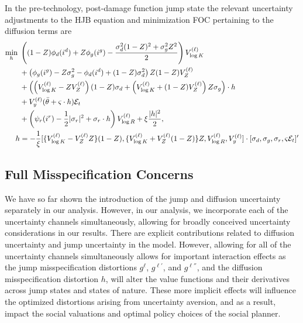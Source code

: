 \documentclass[12pt]{article}
\begin{document}
\begin{appendices}
In the pre-technology, post-damage function jump state the relevant uncertainty adjustments to the HJB equation and minimization FOC pertaining to the diffusion terms are
\begin{equation*}
\begin{split}
\min_{h} \hspace{0.1cm} & \left((1-Z) \phi_d(i^{d})+Z \phi_g(i^{g}) -\frac{   \sigma_d^2 (1-Z)^2 + \sigma_g^2 Z^2 }{2} \right)V^{(\ell)}_{\log K} \\
 & +\left( \phi_g(i^{g}) - Z \sigma_g^2 - \phi_d(i^{d}) + (1-Z) \sigma_d^2  \right) Z (1-Z) V^{(\ell)}_{Z}\\
 & + \left( \left( V^{(\ell)}_{\log K} -  Z V^{(\ell)}_{Z} \right) (1-Z) \sigma_d  + \left( V^{(\ell)}_{\log K} + (1-Z) V^{(\ell)}_{Z} \right)  Z \sigma_g \right) \cdot h \\
 & + V^{(\ell)}_{y} (\bar{\theta} + \varsigma \cdot h) \mathcal{E}_t \\
 & +\left(\psi_{r}(i^{r}) -\frac{1}{2}|\sigma_{r}|^{2} + \sigma_{r} \cdot h \right) V^{(\ell)}_{\log R} + \xi \frac{|h|^2}{2}, \\
h & = -\frac{1}{\xi}[\{V^{(\ell)}_{\log K}-V^{(\ell)}_{Z}Z\}(1-Z),\{V^{(\ell)}_{\log K}+V^{(\ell)}_{Z}(1-Z)\}Z,V^{(\ell)}_{\log R},V^{(\ell)}_{y}]  \cdot[\sigma_{d},\sigma_{g},\sigma_{r},\varsigma \mathcal{E}_t]'    
\end{split}
\end{equation*}

\subsection{Full Misspecification Concerns}

We have so far shown the introduction of the jump and diffusion uncertainty separately in our analysis. However, in our analysis, we incorporate each of the uncertainty channels simultaneously, allowing for broadly conceived uncertainty considerations in our results. There are explicit contributions related to diffusion uncertainty and jump uncertainty in the model. However, allowing for all of the uncertainty channels simultaneously allows for important interaction effects as the jump misspecification distortions $g^{\ell}$, $g^{\ell'}$, and $g^{\ell''}$, and the diffusion misspecification distortion $h$, will alter the value functions and their derivatives across jump states and states of nature. These more implicit effects will influence the optimized distortions arising from uncertainty aversion, and as a result, impact the social valuations and optimal policy choices of the social planner.



\end{appendices}
\end{document}
